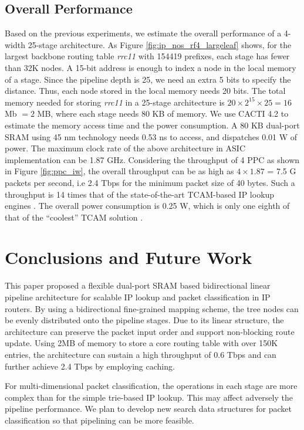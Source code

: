 \documentclass{sigcomm-alternate}
\begin{document}
\subsection{Overall Performance}

Based on the previous experiments, we estimate the overall performance of a 4-width 25-stage architecture. As Figure \ref{fig:ip_nos_rf4_largeleaf} shows, for the largest backbone routing table \textit{rrc11} with 154419 prefixes, each stage has fewer than 32K nodes. A 15-bit address is enough to index a node in the local memory of a stage. Since the pipeline depth is 25, we need an extra 5 bits to specify the distance. Thus, each node stored in the local memory needs 20 bits. The total memory needed for storing \textit{rrc11} in a 25-stage architecture is $20 \times 2^{15} \times 25 = 16$ Mb $= 2$ MB, where each stage needs 80 KB of memory. We use CACTI 4.2\cite{cacti} to estimate the memory access time and the power consumption. A 80 KB dual-port SRAM using 45 nm technology needs 0.53 ns to access, and dispatches 0.01 W of power. The maximum clock rate of the above architecture in ASIC implementation can be 1.87 GHz. Considering the throughput of 4 PPC as shown in Figure \ref{fig:ppc_iw}, the overall throughput can be as high as $4 \times 1.87$ = 7.5 G packets per second, i.e 2.4 Tbps for the minimum packet size of 40 bytes. Such a throughput is 14 times that of the state-of-the-art TCAM-based IP lookup engines \cite{ton06:zheng}. The overall power consumption is 0.25 W, which is only one eighth of that of the ``coolest'' TCAM solution \cite{infocom03:zane}. 




\section{Conclusions and Future Work}
\label{sec:conclusion}

This paper proposed a flexible dual-port SRAM based bidirectional linear pipeline architecture for scalable IP lookup and packet classification in IP routers. By using a bidirectional fine-grained mapping scheme, the tree nodes can be evenly distributed onto the pipeline stages. Due to its linear structure, the architecture can preserve the packet input order and support non-blocking route update. Using 2MB of memory to store a core routing table with over 150K entries, the architecture can sustain a high throughput of 0.6 Tbps and can further achieve 2.4 Tbps by employing caching.

For multi-dimensional packet classification, the operations in each stage are more complex than for the simple trie-based IP lookup. This may affect adversely the pipeline performance. We plan to develop new search data structures for packet classification so that pipelining can be more feasible. 

  
\end{document}
